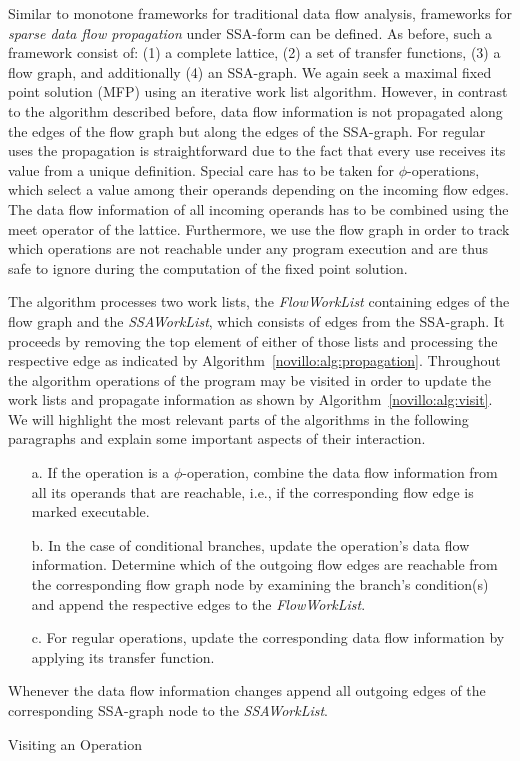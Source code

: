 Similar to monotone frameworks for traditional data flow analysis, frameworks
for \emph{sparse data flow propagation} under SSA-form can be defined. As
before, such a framework consist of: (1) a complete lattice, (2) a set of
transfer functions, (3) a flow graph, and additionally (4) an SSA-graph. We
again seek a maximal fixed point solution (MFP) using an iterative work list
algorithm. However, in contrast to the algorithm described before, data flow
information is not propagated along the edges of the flow graph but along the
edges of the SSA-graph. For regular uses the propagation is straightforward due
to the fact that every use receives its value from a unique definition. Special
care has to be taken for $\phi$-operations, which select a value among their
operands depending on the incoming flow edges. The data flow information of all
incoming operands has to be combined using the meet operator of the lattice.
Furthermore, we use the flow graph in order to track which operations are not
reachable under any program execution and are thus safe to ignore during the
computation of the fixed point solution.

The algorithm processes two work lists, the \emph{FlowWorkList} containing edges
of the flow graph and the \emph{SSAWorkList}, which consists of edges from the
SSA-graph. It proceeds by removing the top element of either of those lists and
processing the respective edge as indicated by
Algorithm~\ref{novillo:alg:propagation}. Throughout the algorithm operations of
the program may be visited in order to update the work lists and propagate
information as shown by Algorithm~\ref{novillo:alg:visit}. We will highlight
the most relevant parts of the algorithms in the following paragraphs and
explain some important aspects of their interaction.

\begin{algorithm}[b!]
  \begin{enumerate}
    \item[a.] \label{novillo:alg:visit:phi} If the operation is a
              $\phi$-operation, combine the data flow information from all its
              operands that are reachable, i.e., if the corresponding flow edge
              is marked executable.
    \item[b.] \label{novillo:alg:visit:branch} In the case of conditional
              branches, update the operation's data flow information. Determine
              which of the outgoing flow edges are reachable from the
              corresponding flow graph node by examining the branch's
              condition(s) and append the respective edges to the
              \emph{FlowWorkList}.
    \item[c.] \label{novillo:alg:visit:regular} For regular operations, update
              the corresponding data flow information by applying its transfer
              function.
    \vspace{-1em}
  \end{enumerate}
  Whenever the data flow information changes append all outgoing edges of the
  corresponding SSA-graph node to the \emph{SSAWorkList}.
  \caption{Visiting an Operation}
  \label{novillo:alg:visit}
\end{algorithm}

